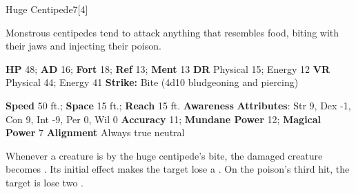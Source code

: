   \begin{monsection}{Huge Centipede}{7}[4]
    \vspace{-1em}\vspace{-1em}
    \vspace{0em}

    
    Monstrous centipedes tend to attack anything that resembles food, biting with their jaws and injecting their poison.
  
    

    \begin{spellcontent}
      \begin{spelltargetinginfo}
        \pari \textbf{HP} 48;
          \textbf{AD} 16;
          \textbf{Fort} 18;
          \textbf{Ref} 13;
          \textbf{Ment} 13
        \pari \textbf{DR} Physical 15; Energy 12
        \pari \textbf{VR} Physical 44; Energy 41
        \pari \textbf{Strike:}
            Bite  (4d10 bludgeoning and piercing)
      \end{spelltargetinginfo}
    \end{spellcontent}
    \begin{monsterfooter}
      \pari \textbf{Speed} 50 ft.;
        \textbf{Space} 15 ft.;
        \textbf{Reach} 15 ft.
      \pari \textbf{Awareness} 
      \pari \textbf{Attributes}:
        Str 9, Dex -1,
        Con 9, Int -9,
        Per 0, Wil 0
      \pari \textbf{Accuracy} 11;
        \textbf{Mundane Power} 12;
      \textbf{Magical Power} 7
      \pari \textbf{Alignment} Always true neutral
    \end{monsterfooter}
  \end{monsection}
    Whenever a creature is  by the huge centipede's bite,
      the damaged creature becomes .
    Its initial effect makes the target lose a .
    On the poison's third hit, the target is lose two .
  
